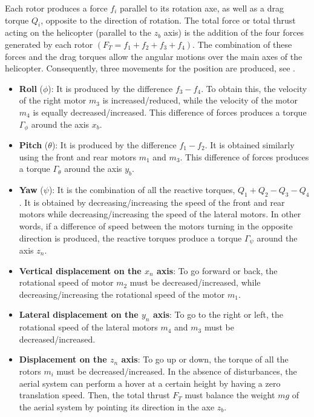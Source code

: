  Each rotor produces a force $f_i$ parallel to its rotation axe, as well as a drag torque $Q_i$, opposite to the direction of rotation. The total force or total thrust acting on the helicopter (parallel to the $z_b$ axis) is the addition of the four forces generated by each rotor $(F_T=f_1+f_2+f_3+f_4)$. The combination of these forces and the drag torques allow the angular motions over the main axes of the helicopter. Consequently, three movements for the position are produced, see .
 \begin{itemize}
   \item \textbf{Roll} ($\phi$): It is produced by the difference $f_3-f_4$. To obtain this, the velocity of the right motor $m_3$ is increased/reduced, while the velocity of the motor $m_4$ is equally decreased/increased. This difference of forces produces a torque $\Gamma_\phi$ around the axis $x_b$.
   \item \textbf{Pitch} ($\theta$): It is produced by the difference $f_1-f_2$. It is obtained similarly using the front and rear motors $m_1$ and $m_3$. This difference of forces produces a torque $\Gamma_\theta$ around the axis $y_b$.
   \item \textbf{Yaw} ($\psi$): It is the combination of all the reactive torques, $Q_1+Q_2-Q_3-Q_4$. It is obtained by decreasing/increasing the speed of the front and rear motors while decreasing/increasing the speed of the lateral motors. In other words, if a difference of speed between the motors turning in the opposite direction is produced, the reactive torques produce a torque $\Gamma_\psi$ around the axis $z_n$.
   \item \textbf{Vertical displacement on the $x_n$ axis}: To go forward or back, the rotational speed of motor $m_2$ must be decreased/increased, while decreasing/increasing the rotational speed of the motor $m_1$.
   \item \textbf{Lateral displacement on the $y_n$ axis}: To go to the right or left, the rotational speed of the lateral motors $m_4$ and $m_3$ must be decreased/increased.
   \item \textbf{Displacement on the $z_n$ axis}: To go up or down, the torque of all the rotors $m_i$ must be decreased/increased. In the absence of disturbances, the aerial system can perform a hover at a certain height by having a zero translation speed. Then, the total thrust $F_T$ must balance the weight $mg$ of the aerial system by pointing its direction in the axe $z_b$.
 \end{itemize}

